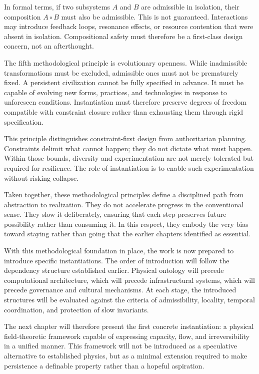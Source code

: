 \documentclass[12pt,oneside]{book}
\begin{document}
In formal terms, if two subsystems \(A\) and \(B\) are admissible in isolation, their composition \(A \circ B\) must also be admissible. This is not guaranteed. Interactions may introduce feedback loops, resonance effects, or resource contention that were absent in isolation. Compositional safety must therefore be a first-class design concern, not an afterthought.

The fifth methodological principle is evolutionary openness. While inadmissible transformations must be excluded, admissible ones must not be prematurely fixed. A persistent civilization cannot be fully specified in advance. It must be capable of evolving new forms, practices, and technologies in response to unforeseen conditions. Instantiation must therefore preserve degrees of freedom compatible with constraint closure rather than exhausting them through rigid specification.

This principle distinguishes constraint-first design from authoritarian planning. Constraints delimit what cannot happen; they do not dictate what must happen. Within those bounds, diversity and experimentation are not merely tolerated but required for resilience. The role of instantiation is to enable such experimentation without risking collapse.

Taken together, these methodological principles define a disciplined path from abstraction to realization. They do not accelerate progress in the conventional sense. They slow it deliberately, ensuring that each step preserves future possibility rather than consuming it. In this respect, they embody the very bias toward staying rather than going that the earlier chapters identified as essential.

With this methodological foundation in place, the work is now prepared to introduce specific instantiations. The order of introduction will follow the dependency structure established earlier. Physical ontology will precede computational architecture, which will precede infrastructural systems, which will precede governance and cultural mechanisms. At each stage, the introduced structures will be evaluated against the criteria of admissibility, locality, temporal coordination, and protection of slow invariants.

The next chapter will therefore present the first concrete instantiation: a physical field-theoretic framework capable of expressing capacity, flow, and irreversibility in a unified manner. This framework will not be introduced as a speculative alternative to established physics, but as a minimal extension required to make persistence a definable property rather than a hopeful aspiration.
\end{document}
